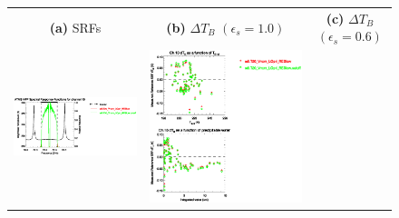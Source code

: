 \begin{figure}[H]
  \centering
  \begin{tabular}{c c c}
    \textsf{\textbf{(a)} SRFs} &
    \textsf{\textbf{(b)} $\Delta T_B$ $(\epsilon_s = 1.0)$} &
    \textsf{\textbf{(c)} $\Delta T_B$ $(\epsilon_s = 0.6)$} \\
    \includegraphics[bb=80 400 280 558,clip,scale=0.85]{graphics/srf/Rset/atms_npp.ch10.osrf.eps} &
    \includegraphics[bb=85 400 260 558,clip,scale=0.85]{graphics/dtb/Rset/e1.0_r0.0/atms_npp.ch10.dTb.eps} & 

\end{tabular}
\end{figure}
